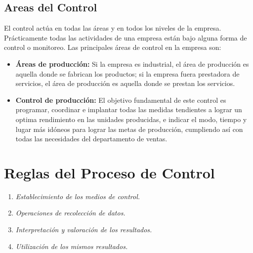 \documentclass[12pt,letterpaper]{book}
\begin{document}
\subsection{Areas del Control}
El control actúa en todas las áreas y en todos los niveles de la empresa. Prácticamente todas las actividades de una empresa están bajo alguna forma de control o monitoreo. Las principales áreas de control en la empresa son:
\begin{itemize}
\item \textbf{Áreas de producción:} Si la empresa es industrial, el área de producción es aquella donde se fabrican los productos; si la empresa fuera prestadora de servicios, el área de producción es aquella donde se prestan los servicios.
\item \textbf{Control de producción:} El objetivo fundamental de este control es programar, coordinar e implantar todas las medidas tendientes a lograr un optima rendimiento en las unidades producidas, e indicar el modo, tiempo y lugar más idóneos para lograr las metas de producción, cumpliendo así con todas las necesidades del departamento de ventas. 
\end{itemize}
\section{Reglas del Proceso de Control}
\begin{enumerate}
\item	\textit{Establecimiento de los medios de control.}
\item	\textit{Operaciones de recolección de datos.}
\item	\textit{Interpretación y valoración de los resultados.}
\item	\textit{Utilización de los mismos resultados.}

\end{enumerate}
\end{document}
